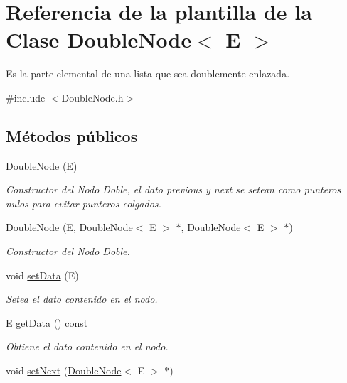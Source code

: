 \hypertarget{classDoubleNode}{\section{Referencia de la plantilla de la Clase Double\-Node$<$ E $>$}
\label{classDoubleNode}
}


Es la parte elemental de una lista que sea doublemente enlazada.  




{\ttfamily \#include $<$Double\-Node.\-h$>$}

\subsection*{Métodos públicos}
\begin{DoxyCompactItemize}
\item 
\hyperlink{classDoubleNode_a915ac8a626f09ec53db64b7c5b294b2d}{Double\-Node} (E)
\begin{DoxyCompactList}\small\item\em Constructor del Nodo Doble, el dato previous y next se setean como punteros nulos para evitar punteros colgados. \end{DoxyCompactList}\item 
\hyperlink{classDoubleNode_a53d29dbf397d39b420f64ab943b62cee}{Double\-Node} (E, \hyperlink{classDoubleNode}{Double\-Node}$<$ E $>$ $\ast$, \hyperlink{classDoubleNode}{Double\-Node}$<$ E $>$ $\ast$)
\begin{DoxyCompactList}\small\item\em Constructor del Nodo Doble. \end{DoxyCompactList}\item 
void \hyperlink{classDoubleNode_a21f86a81b7d4e4db966e07ce06da4f3a}{set\-Data} (E)
\begin{DoxyCompactList}\small\item\em Setea el dato contenido en el nodo. \end{DoxyCompactList}\item 
E \hyperlink{classDoubleNode_a59310f31d21f431febc4d329e1f10699}{get\-Data} () const 
\begin{DoxyCompactList}\small\item\em Obtiene el dato contenido en el nodo. \end{DoxyCompactList}\item 
void \hyperlink{classDoubleNode_aba52422e27040e524ba629445e9d8b93}{set\-Next} (\hyperlink{classDoubleNode}{Double\-Node}$<$ E $>$ $\ast$)

\end{DoxyCompactItemize}
